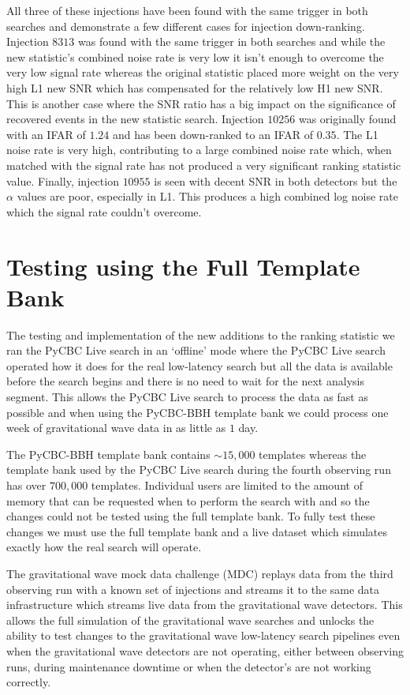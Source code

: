 %
All three of these injections have been found with the same trigger in both searches and demonstrate a few different cases for injection down-ranking. Injection $8313$ was found with the same trigger in both searches and while the new statistic's combined noise rate is very low it isn't enough to overcome the very low signal rate whereas the original statistic placed more weight on the very high L1 new SNR which has compensated for the relatively low H1 new SNR. This is another case where the SNR ratio has a big impact on the significance of recovered events in the new statistic search. Injection $10256$ was originally found with an IFAR of $1.24$ and has been down-ranked to an IFAR of $0.35$. The L1 noise rate is very high, contributing to a large combined noise rate which, when matched with the signal rate has not produced a very significant ranking statistic value. Finally, injection $10955$ is seen with decent SNR in both detectors but the $\alpha$ values are poor, especially in L1. This produces a high combined log noise rate which the signal rate couldn't overcome. 

\section{\label{5:sec:mdc-test}Testing using the Full Template Bank}

The testing and implementation of the new additions to the ranking statistic we ran the PyCBC Live search in an `offline' mode where the PyCBC Live search operated how it does for the real low-latency search but all the data is available before the search begins and there is no need to wait for the next analysis segment. This allows the PyCBC Live search to process the data as fast as possible and when using the PyCBC-BBH template bank we could process one week of gravitational wave data in as little as $1$ day.

The PyCBC-BBH template bank contains $\sim15,000$ templates whereas the template bank used by the PyCBC Live search during the fourth observing run has over $700,000$ templates. Individual users are limited to the amount of memory that can be requested when to perform the search with and so the changes could not be tested using the full template bank. To fully test these changes we must use the full template bank and a live dataset which simulates exactly how the real search will operate.

The gravitational wave mock data challenge (MDC) replays data from the third observing run with a known set of injections and streams it to the same data infrastructure which streams live data from the gravitational wave detectors. This allows the full simulation of the gravitational wave searches and unlocks the ability to test changes to the gravitational wave low-latency search pipelines even when the gravitational wave detectors are not operating, either between observing runs, during maintenance downtime or when the detector's are not working correctly.

